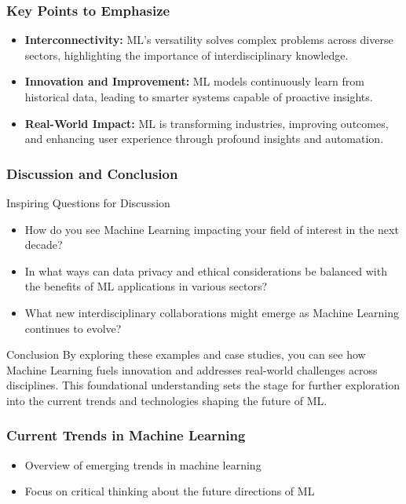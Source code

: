 \documentclass[aspectratio=169]{beamer}
\begin{document}
\begin{frame}[fragile]
    \frametitle{Key Points to Emphasize}
    \begin{itemize}
        \item \textbf{Interconnectivity:} ML's versatility solves complex problems across diverse sectors, highlighting the importance of interdisciplinary knowledge.
        \item \textbf{Innovation and Improvement:} ML models continuously learn from historical data, leading to smarter systems capable of proactive insights.
        \item \textbf{Real-World Impact:} ML is transforming industries, improving outcomes, and enhancing user experience through profound insights and automation.
    \end{itemize}
\end{frame}

\begin{frame}[fragile]
    \frametitle{Discussion and Conclusion}
    \begin{block}{Inspiring Questions for Discussion}
        \begin{itemize}
            \item How do you see Machine Learning impacting your field of interest in the next decade?
            \item In what ways can data privacy and ethical considerations be balanced with the benefits of ML applications in various sectors?
            \item What new interdisciplinary collaborations might emerge as Machine Learning continues to evolve?
        \end{itemize}
    \end{block}

    \begin{block}{Conclusion}
        By exploring these examples and case studies, you can see how Machine Learning fuels innovation and addresses real-world challenges across disciplines.
        This foundational understanding sets the stage for further exploration into the current trends and technologies shaping the future of ML.
    \end{block}
\end{frame}

\begin{frame}[fragile]
    \frametitle{Current Trends in Machine Learning}
    \begin{itemize}
        \item Overview of emerging trends in machine learning
        \item Focus on critical thinking about the future directions of ML
    \end{itemize}
\end{frame}
\end{document}
